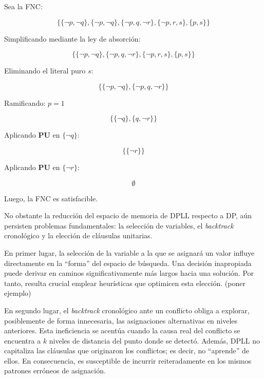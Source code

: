 Sea la FNC:

\begin{equation*}
\{\{\neg p,\neg q\},\{\neg p, \neg q\},\{\neg p,q,\neg r\},\{\neg p,r,s\},\{p,s\}\}
\end{equation*}

Simplificando mediante la ley de absorción:

\begin{equation*}
\{\{\neg p,\neg q\},\{\neg p,q,\neg r\},\{\neg p,r,s\},\{p,s\}\}
\end{equation*}

Eliminando el literal puro $s$:

\begin{equation*}
\{\{\neg p,\neg q\},\{\neg p,q,\neg r\}\}
\end{equation*}

Ramificando: $p = 1$

\begin{equation*}
\{\{\neg q\},\{q,\neg r\}\}
\end{equation*}

Aplicando \textbf{PU} en $\{\neg q\}$:

\begin{equation*}
\{\{\neg r\}\}
\end{equation*}

Aplicando \textbf{PU} en $\{\neg r\}$:

\begin{equation*}
\emptyset
\end{equation*}

Luego, la FNC es satisfacible.

No obstante la reducción del espacio de memoria de DPLL respecto a DP, aún persisten problemas fundamentales: la selección de variables, el \textit{backtrack} cronológico y la elección de cláusulas unitarias.

En primer lugar, la selección de la variable a la que se asignará un valor influye directamente en la ``forma'' del espacio de búsqueda. Una decisión inapropiada puede derivar en caminos significativamente más largos hacia una solución. Por tanto, resulta crucial emplear heurísticas que optimicen esta elección. (poner ejemplo)

En segundo lugar, el \textit{backtrack} cronológico ante un conflicto obliga a explorar, posiblemente de forma innecesaria, las asignaciones alternativas en niveles anteriores. Esta ineficiencia se acentúa cuando la causa real del conflicto se encuentra a $k$ niveles de distancia del punto donde se detectó. Además, DPLL no capitaliza las cláusulas que originaron los conflictos; es decir, no ``aprende'' de ellos. En consecuencia, es susceptible de incurrir reiteradamente en los mismos patrones erróneos de asignación.

